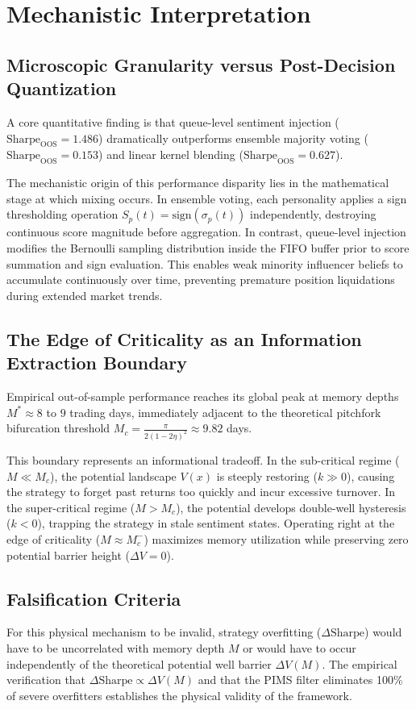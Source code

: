 \section{Mechanistic Interpretation}

\subsection{Microscopic Granularity versus Post-Decision Quantization}
A core quantitative finding is that queue-level sentiment injection ($\text{Sharpe}_{\text{OOS}} = 1.486$) dramatically outperforms ensemble majority voting ($\text{Sharpe}_{\text{OOS}} = 0.153$) and linear kernel blending ($\text{Sharpe}_{\text{OOS}} = 0.627$). 

The mechanistic origin of this performance disparity lies in the mathematical stage at which mixing occurs. In ensemble voting, each personality applies a sign thresholding operation $S_p(t) = \text{sign}(\sigma_p(t))$ independently, destroying continuous score magnitude before aggregation. In contrast, queue-level injection modifies the Bernoulli sampling distribution inside the FIFO buffer prior to score summation and sign evaluation. This enables weak minority influencer beliefs to accumulate continuously over time, preventing premature position liquidations during extended market trends.

\subsection{The Edge of Criticality as an Information Extraction Boundary}
Empirical out-of-sample performance reaches its global peak at memory depths $M^* \approx 8$ to $9$ trading days, immediately adjacent to the theoretical pitchfork bifurcation threshold $M_c = \frac{\pi}{2(1-2\eta)^2} \approx 9.82$ days.

This boundary represents an informational tradeoff. In the sub-critical regime ($M \ll M_c$), the potential landscape $V(x)$ is steeply restoring ($k \gg 0$), causing the strategy to forget past returns too quickly and incur excessive turnover. In the super-critical regime ($M > M_c$), the potential develops double-well hysteresis ($k < 0$), trapping the strategy in stale sentiment states. Operating right at the edge of criticality ($M \approx M_c^-$) maximizes memory utilization while preserving zero potential barrier height ($\Delta V = 0$).

\subsection{Falsification Criteria}
For this physical mechanism to be invalid, strategy overfitting ($\Delta \text{Sharpe}$) would have to be uncorrelated with memory depth $M$ or would have to occur independently of the theoretical potential well barrier $\Delta V(M)$. The empirical verification that $\Delta \text{Sharpe} \propto \Delta V(M)$ and that the PIMS filter eliminates 100\% of severe overfitters establishes the physical validity of the framework.
